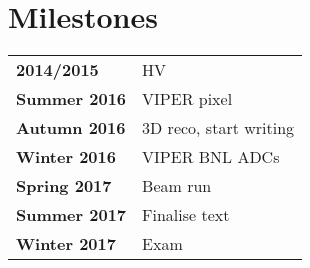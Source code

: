 \chapter{Milestones\label{chap:milestones}}
\begin{tabular}{ll}
	\textbf{2014/2015} &	HV\cite{breakdown_16,latex} \\
	\textbf{Summer 2016} &	VIPER pixel \\
	\textbf{Autumn 2016} &	3D reco, start writing \\
	\textbf{Winter 2016} &	VIPER BNL ADCs \\
	\textbf{Spring 2017} &	Beam run \\
	\textbf{Summer 2017} &	Finalise text \\
	\textbf{Winter 2017} &	Exam
\end{tabular}
